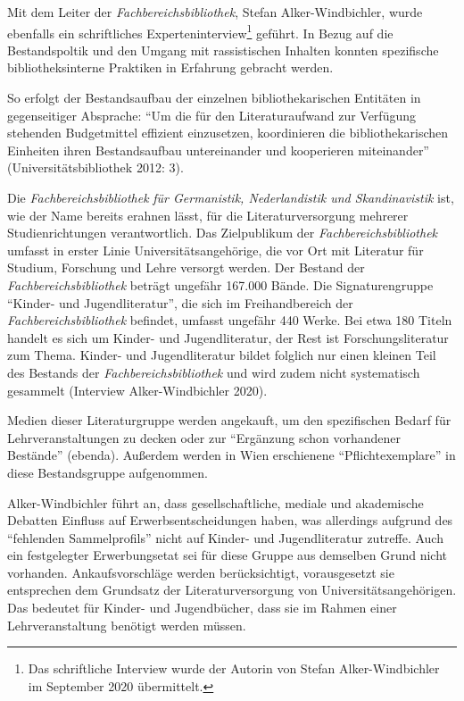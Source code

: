 \documentclass[a4paper,
fontsize=11pt,
oneside,
numbers=noperiodatend,
parskip=half-,
bibliography=totoc,
final
]{scrartcl}
\begin{document}
Mit dem Leiter der \emph{Fachbereichsbibliothek}, Stefan
Alker-Windbichler, wurde ebenfalls ein schriftliches
Experteninterview\footnote{Das schriftliche Interview wurde der Autorin
  von Stefan Alker-Windbichler im September 2020 übermittelt.} geführt.
In Bezug auf die Bestandspoltik und den Umgang mit rassistischen
Inhalten konnten spezifische bibliotheksinterne Praktiken in Erfahrung
gebracht werden.

So erfolgt der Bestandsaufbau der einzelnen bibliothekarischen Entitäten
in gegenseitiger Absprache: \enquote{Um die für den Literaturaufwand zur
Verfügung stehenden Budgetmittel effizient einzusetzen, koordinieren die
bibliothekarischen Einheiten ihren Bestandsaufbau untereinander und
kooperieren miteinander} (Universitätsbibliothek 2012: 3).

Die \emph{Fachbereichsbibliothek} \emph{für Germanistik, Nederlandistik
und Skandinavistik} ist, wie der Name bereits erahnen lässt, für die
Literaturversorgung mehrerer Studienrichtungen verantwortlich. Das
Zielpublikum der \emph{Fachbereichsbibliothek} umfasst in erster Linie
Universitätsangehörige, die vor Ort mit Literatur für Studium, Forschung
und Lehre versorgt werden. Der Bestand der \emph{Fachbereichsbibliothek}
beträgt ungefähr 167.000 Bände. Die Signaturengruppe \enquote{Kinder- und
Jugendliteratur}, die sich im Freihandbereich der
\emph{Fachbereichsbibliothek} befindet, umfasst ungefähr 440 Werke. Bei
etwa 180 Titeln handelt es sich um Kinder- und Jugendliteratur, der Rest
ist Forschungsliteratur zum Thema. Kinder- und Jugendliteratur bildet
folglich nur einen kleinen Teil des Bestands der
\emph{Fachbereichsbibliothek} und wird zudem nicht systematisch
gesammelt (Interview Alker-Windbichler 2020).

Medien dieser Literaturgruppe werden angekauft, um den spezifischen
Bedarf für Lehrveranstaltungen zu decken oder zur \enquote{Ergänzung schon
vorhandener Bestände} (ebenda). Außerdem werden in Wien erschienene
\enquote{Pflichtexemplare} in diese Bestandsgruppe aufgenommen.

Alker-Windbichler führt an, dass gesellschaftliche, mediale und
akademische Debatten Einfluss auf Erwerbsentscheidungen haben, was
allerdings aufgrund des \enquote{fehlenden Sammelprofils} nicht auf Kinder-
und Jugendliteratur zutreffe. Auch ein festgelegter Erwerbungsetat sei
für diese Gruppe aus demselben Grund nicht vorhanden. Ankaufsvorschläge
werden berücksichtigt, vorausgesetzt sie entsprechen dem Grundsatz der
Literaturversorgung von Universitätsangehörigen. Das bedeutet für
Kinder- und Jugendbücher, dass sie im Rahmen einer Lehrveranstaltung
benötigt werden müssen.
\end{document}
